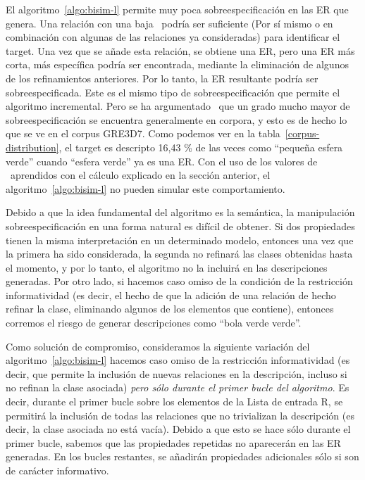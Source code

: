 El algoritmo~\ref{algo:bisim-l} permite muy poca sobreespecificaci\'on en las ER que
genera. Una relaci\'on con una baja \puse\ podr\'{i}a ser suficiente
(Por s\'{i} mismo o en combinaci\'on con algunas de las relaciones ya consideradas) para
identificar el target. Una vez que se a\~nade esta relaci\'on, se obtiene una ER, pero una ER m\'as corta,
m\'as espec\'{i}fica podr\'{i}a ser encontrada, mediante la eliminaci\'on de algunos de los refinamientos anteriores.
Por lo tanto, la ER resultante podr\'{i}a ser sobreespecificada. Este es el mismo tipo de sobreespecificaci\'on
que permite el algoritmo incremental. Pero se ha argumentado~\cite{Engelhardt_Bailey_Ferreira_2006, Arts_Maes_Noordman_Jansen_2011} que
un grado mucho mayor de sobreespecificaci\'on se encuentra generalmente en corpora, y esto
es de hecho lo que se ve en el corpus GRE3D7. Como podemos ver en la tabla~\ref{corpus-distribution},
el target es descripto 16,43 \% de las veces como ``peque\~na esfera verde'' cuando ``esfera verde'' ya es una ER. Con el uso de los valores de \puse\ aprendidos con el c\'alculo explicado en la secci\'on anterior, el algoritmo~\ref{algo:bisim-l} no pueden simular este comportamiento.

Debido a que la idea fundamental del algoritmo es la sem\'antica, la manipulaci\'on sobreespecificaci\'on en
una forma natural es dif\'{i}cil de obtener. Si dos propiedades tienen la misma interpretaci\'on en un determinado
modelo, entonces una vez que la primera ha sido considerada, la segunda no refinar\'a las clases
obtenidas hasta el momento, y por lo tanto, el algoritmo no la incluir\'a en las descripciones generadas.
Por otro lado, si hacemos caso omiso de la condici\'on de la restricci\'on informatividad (es decir,
el hecho de que la adici\'on de una relaci\'on de hecho refinar la clase, eliminando algunos de
los elementos que contiene), entonces corremos el riesgo de generar descripciones como ``bola verde verde''.

Como soluci\'on de compromiso, consideramos la siguiente variaci\'on del algoritmo~\ref{algo:bisim-l} 
hacemos caso omiso de la restricci\'on informatividad (es decir, que permite la inclusi\'on de nuevas relaciones
en la descripci\'on, incluso si no refinan la clase asociada) \emph{pero s\'olo durante el
primer bucle del algoritmo}. Es decir, durante el primer bucle sobre los elementos de la
Lista de entrada R, se permitir\'a la inclusi\'on de todas las relaciones que no trivializan la
descripci\'on (es decir, la clase asociada no est\'a vac\'{i}a). Debido a que esto se hace s\'olo durante
el primer bucle, sabemos que las propiedades repetidas no aparecer\'an en las ER generadas.
En los bucles restantes, se a\~nadir\'an propiedades adicionales s\'olo si son de car\'acter informativo.



